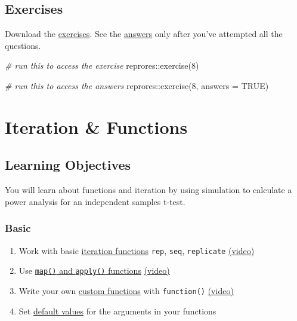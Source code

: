 \documentclass[
  oneside]{book}
\newenvironment{Shaded}{\begin{snugshade}}{\end{snugshade}}
\newcommand{\AttributeTok}[1]{\textcolor[rgb]{0.77,0.63,0.00}{#1}}
\newcommand{\CommentTok}[1]{\textcolor[rgb]{0.56,0.35,0.01}{\textit{#1}}}
\newcommand{\ConstantTok}[1]{\textcolor[rgb]{0.00,0.00,0.00}{#1}}
\newcommand{\DecValTok}[1]{\textcolor[rgb]{0.00,0.00,0.81}{#1}}
\newcommand{\FunctionTok}[1]{\textcolor[rgb]{0.00,0.00,0.00}{#1}}
\newcommand{\NormalTok}[1]{#1}
\newcommand{\SpecialCharTok}[1]{\textcolor[rgb]{0.00,0.00,0.00}{#1}}
\providecommand{\tightlist}{%
  \setlength{\itemsep}{0pt}\setlength{\parskip}{0pt}}
\begin{document}
\hypertarget{exercises-glm}{%
\section{Exercises}\label{exercises-glm}}

Download the \href{exercises/08_glm_exercise.Rmd}{exercises}. See the \href{exercises/08_glm_answers.Rmd}{answers} only after you've attempted all the questions.

\begin{Shaded}
\begin{Highlighting}[]
\CommentTok{\# run this to access the exercise}
\NormalTok{reprores}\SpecialCharTok{::}\FunctionTok{exercise}\NormalTok{(}\DecValTok{8}\NormalTok{)}

\CommentTok{\# run this to access the answers}
\NormalTok{reprores}\SpecialCharTok{::}\FunctionTok{exercise}\NormalTok{(}\DecValTok{8}\NormalTok{, }\AttributeTok{answers =} \ConstantTok{TRUE}\NormalTok{)}
\end{Highlighting}
\end{Shaded}

\hypertarget{func}{%
\chapter{Iteration \& Functions}\label{func}}

\hypertarget{ilo7}{%
\section{Learning Objectives}\label{ilo7}}

You will learn about functions and iteration by using simulation to calculate a power analysis for an independent samples t-test.

\hypertarget{basic-5}{%
\subsection{Basic}\label{basic-5}}

\begin{enumerate}
\def\labelenumi{\arabic{enumi}.}
\tightlist
\item
  Work with basic \protect\hyperlink{iteration-functions}{iteration functions} \texttt{rep}, \texttt{seq}, \texttt{replicate} \href{https://youtu.be/X3zFA71JzgE}{(video)}
\item
  Use \protect\hyperlink{map-apply}{\texttt{map()} and \texttt{apply()} functions} \href{https://youtu.be/HcZxQZwJ8T4}{(video)}
\item
  Write your own \protect\hyperlink{custom-functions}{custom functions} with \texttt{function()} \href{https://youtu.be/Qqjva0xgYC4}{(video)}
\item
  Set \protect\hyperlink{defaults}{default values} for the arguments in your functions
\end{enumerate}
\end{document}

